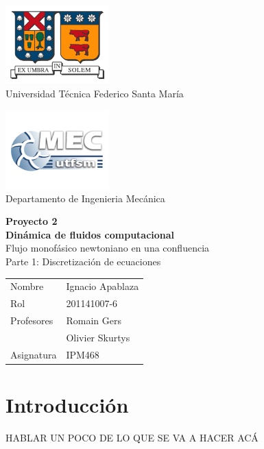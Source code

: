 \documentclass[12pt, a4paper]{article}
\begin{document}
\thispagestyle{empty}

\hspace{-5mm}
\begin{minipage}[c]{7cm}
\centering
\includegraphics[width=4cm]{logoutfsm.jpg} \\
Universidad Técnica Federico Santa María
\end{minipage}
\hfill
\hspace{20mm}
\begin{minipage}[c]{7cm}
\centering
\includegraphics[width=4cm]{logomec1.jpg} \\
Departamento de Ingenieria Mecánica
\end{minipage}

\begin{center}
\vfill
 \Huge{{\bf Proyecto 2 }} \\ 
 \Huge{ {\bf Dinámica de fluidos computacional}} \\ \vspace{1cm}
 \Large{Flujo monofásico newtoniano en una confluencia} \\
 \Large{Parte 1: Discretización de ecuaciones} 
\vfill
\end{center}

\vfill \hfill
\begin{tabular}{l @{ : } l}
Nombre &   Ignacio Apablaza \\
Rol & 201141007-6  \\
Profesores & Romain Gers \\
			& Olivier Skurtys \\
Asignatura & IPM468 \\
\end{tabular}

\newpage


\tableofcontents


\newpage

\section{Introducción}
HABLAR UN POCO DE LO QUE SE VA A HACER ACÁ
\newpage


\newpage
\end{document}
